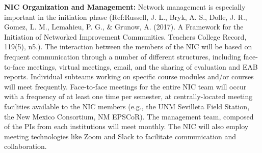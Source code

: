\textbf{NIC Organization and Management:} Network management is especially important in the initiation phase (Ref:Russell, J. L., Bryk, A. S., Dolle, J. R., Gomez, L. M., Lemahieu, P. G., \& Grunow, A. (2017). A Framework for the Initiation of Networked Improvement Communities. Teachers College Record, 119(5), n5.). The interaction between the members of the NIC will be based on frequent communication through a number of different structures, including face-to-face meetings, virtual meetings, email, and the sharing of evaluation and EAB reports. Individual subteams working on specific course modules and/or courses will meet frequently. Face-to-face meetings for the entire NIC team will occur with a frequency of at least one time per semester, at centrally-located meeting facilities available to the NIC members (e.g., the UNM Sevilleta Field Station, the New Mexico Consortium, NM EPSCoR). The management team, composed of the PIs from each institutions will meet monthly. The NIC will also employ meeting technologies like Zoom and Slack to facilitate communication and collaboration.
